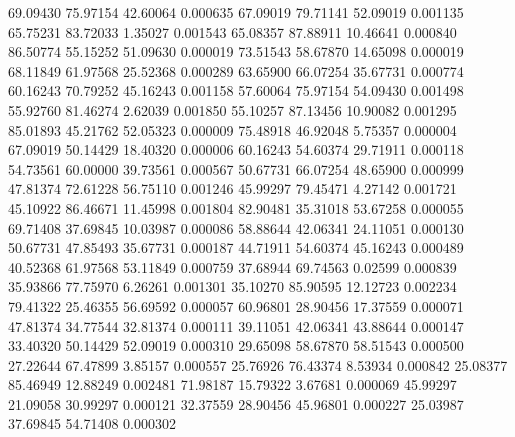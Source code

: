        69.09430       75.97154       42.60064       0.000635
       67.09019       79.71141       52.09019       0.001135
       65.75231       83.72033        1.35027       0.001543
       65.08357       87.88911       10.46641       0.000840
       86.50774       55.15252       51.09630       0.000019
       73.51543       58.67870       14.65098       0.000019
       68.11849       61.97568       25.52368       0.000289
       63.65900       66.07254       35.67731       0.000774
       60.16243       70.79252       45.16243       0.001158
       57.60064       75.97154       54.09430       0.001498
       55.92760       81.46274        2.62039       0.001850
       55.10257       87.13456       10.90082       0.001295
       85.01893       45.21762       52.05323       0.000009
       75.48918       46.92048        5.75357       0.000004
       67.09019       50.14429       18.40320       0.000006
       60.16243       54.60374       29.71911       0.000118
       54.73561       60.00000       39.73561       0.000567
       50.67731       66.07254       48.65900       0.000999
       47.81374       72.61228       56.75110       0.001246
       45.99297       79.45471        4.27142       0.001721
       45.10922       86.46671       11.45998       0.001804
       82.90481       35.31018       53.67258       0.000055
       69.71408       37.69845       10.03987       0.000086
       58.88644       42.06341       24.11051       0.000130
       50.67731       47.85493       35.67731       0.000187
       44.71911       54.60374       45.16243       0.000489
       40.52368       61.97568       53.11849       0.000759
       37.68944       69.74563        0.02599       0.000839
       35.93866       77.75970        6.26261       0.001301
       35.10270       85.90595       12.12723       0.002234
       79.41322       25.46355       56.69592       0.000057
       60.96801       28.90456       17.37559       0.000071
       47.81374       34.77544       32.81374       0.000111
       39.11051       42.06341       43.88644       0.000147
       33.40320       50.14429       52.09019       0.000310
       29.65098       58.67870       58.51543       0.000500
       27.22644       67.47899        3.85157       0.000557
       25.76926       76.43374        8.53934       0.000842
       25.08377       85.46949       12.88249       0.002481
       71.98187       15.79322        3.67681       0.000069
       45.99297       21.09058       30.99297       0.000121
       32.37559       28.90456       45.96801       0.000227
       25.03987       37.69845       54.71408       0.000302
